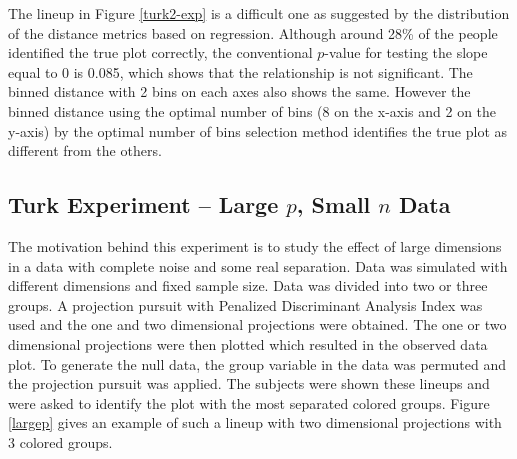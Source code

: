 \documentclass[12]{article}
\begin{document}
The lineup in Figure \ref{turk2-exp} is a difficult one as suggested by the distribution of the distance metrics based on regression. Although around 28\% of the people identified the true plot correctly, the conventional $p$-value for testing the slope equal to 0 is 0.085, which shows that the relationship is not significant. The binned distance with 2 bins on each axes also shows the same. However the binned distance using the optimal number of bins (8 on the x-axis and 2 on the y-axis) by the optimal number of bins selection method identifies the true plot as different from the others. 

%




\subsection{Turk Experiment -- Large $p$, Small $n$ Data}

The motivation behind this experiment is to study the effect of large dimensions in a data with complete noise and some real separation. Data was simulated with different dimensions and fixed sample size. Data was divided into two or three groups. A projection pursuit with Penalized Discriminant Analysis Index was used and the one and two dimensional projections were obtained. The one or two dimensional projections were then plotted which resulted in the observed data plot. To generate the null data, the group variable in the data was permuted and the projection pursuit was applied. The subjects were shown these lineups and were asked to identify the plot with the most separated colored groups. Figure \ref{largep} gives an example of such a lineup with two dimensional projections with 3 colored groups. 
\end{document}
